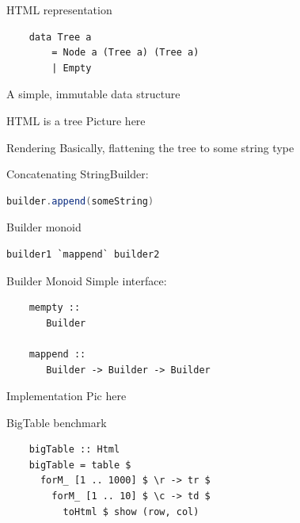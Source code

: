 \documentclass[20pt]{beamer}
\newcommand{\vspaced}{
    \vspace{5mm}
}
\begin{document}
\begin{frame}[fragile]{HTML representation}
    \begin{lstlisting}
    data Tree a
        = Node a (Tree a) (Tree a)
        | Empty
    \end{lstlisting}
    \vspaced
    A simple, immutable data structure
\end{frame}

\begin{frame}{HTML is a tree}
    Picture here
\end{frame}

\begin{frame}{Rendering}
    Basically, flattening the tree to some string type
\end{frame}

\begin{frame}[fragile]{Concatenating}
    StringBuilder:
    \begin{lstlisting}[language=Java]
    builder.append(someString)
    \end{lstlisting}
    \vspaced

    Builder monoid
    \begin{lstlisting}[language=Java]
    builder1 `mappend` builder2
    \end{lstlisting}
\end{frame}

\begin{frame}[fragile]{Builder Monoid}
    Simple interface:
    \vspaced
    \begin{lstlisting}
    mempty ::
       Builder

    mappend ::
       Builder -> Builder -> Builder
    \end{lstlisting}
\end{frame}

\begin{frame}[fragile]{Implementation}
    Pic here
\end{frame}

\begin{frame}[fragile, b]{BigTable benchmark}
    \begin{lstlisting}
    bigTable :: Html
    bigTable = table $
      forM_ [1 .. 1000] $ \r -> tr $
        forM_ [1 .. 10] $ \c -> td $
          toHtml $ show (row, col)
    \end{lstlisting}
    \vspaced
\end{frame}
\end{document}
